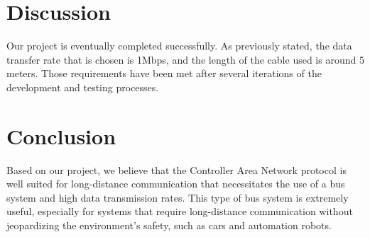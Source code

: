 
\section{Discussion}

Our project is eventually completed successfully. As previously stated, the data transfer rate that is chosen is 1Mbps, and the length of the cable used is around 5 meters. Those requirements have been met  after several iterations of the development and testing processes.



\section{Conclusion}

Based on our project, we believe that the Controller Area Network protocol is well suited for long-distance communication that necessitates the use of a bus system and high data transmission rates. This type of bus system is extremely useful, especially for systems that require long-distance communication without jeopardizing the environment's safety, such as cars and automation robots.
